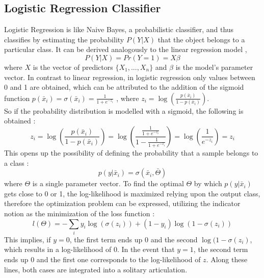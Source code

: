 \documentclass[a4paper, 11pt,titlepage,oneside,openany]{book}
\begin{document}
\subsection{Logistic Regression Classifier}
\noindent Logistic Regression is like Naive Bayes, a probabilistic classifier, and thus classifies by estimating the probability $P(Y|X)$ that the object belongs to a particular class.
It can be derived analogously to the linear regression model \cite{logisticregressionbook}, 
\[
P(Y|X)=Pr(Y=1)=X\beta
\]
where $X$ is the vector of predictors $\{X_1,...,X_n\}$ and $\beta$ is the model's parameter vector. In contrast to linear regression, in logistic regression only values between 0 and 1 are obtained, which can be attributed to the addition of the sigmoid function $p(\bar{x}_i)=\sigma(\bar{x}_i)=\frac{1}{1+e^{-z_i}}$ \cite{algorithms2}, where $z_i=\log(\frac{p(\bar{x}_i)}{1-p(\bar{x}_i)})$. \\
So if the probability distribution is modelled with a sigmoid, the following is obtained \cite{algorithms2}:
\[
z_i=\log(\frac{p(\bar{x}_i)}{1-p(\bar{x}_i)})=\log(\frac{\frac{1}{1+e^{-z_i}}}{1-\frac{1}{1+e^{-z_i}}})=\log(\frac{1}{e^{-z_i}})=z_i
\]
This opens up the possibility of defining the probability that a sample belongs to a class \cite{algorithms2}:
\[
p(y|\bar{x}_i)=\sigma(\bar{x}_i,\bar{\Theta})
\]
where $\Theta$ is a single parameter vector.
\noindent To find the optimal $\Theta$ by which $p(y|\bar{x}_i)$ gets close to 0 or 1, the log-likelihood is maximized relying upon the output class, therefore the optimization problem can be expressed, utilizing the indicator notion as the minimization of the loss function \cite{algorithms}:
\[
l(\Theta)=-\sum_{i}y_i\log(\sigma(z_i))+(1-y_i)\log(1-\sigma(z_i))
\]
\noindent This implies, if $y=0$, the first term ends up $0$ and the second $\log(1-\sigma(z_i)$, which results in a log-likelihood of $0$. In the event that $y=1$, the second term ends up 0 and the first one corresponds to the log-likelihood of $z$. Along these lines, both cases are integrated into a solitary articulation. \\
\end{document}
